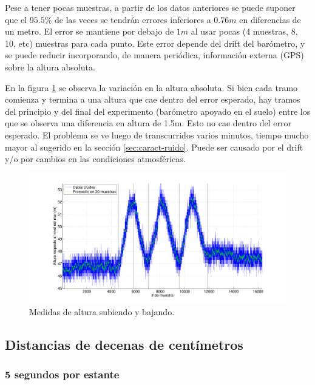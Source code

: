 \documentclass[main]{subfiles}
\begin{document}
Pese a tener pocas muestras, a partir de los datos anteriores se puede suponer que el $95.5 \%$ de las veces se tendrán errores inferiores a $0.76m$ en diferencias de un metro. El error se mantiene por debajo de $1m$ al usar pocas (4 muestras, 8, 10, etc) muestras para cada punto. Este error depende del drift del barómetro, y se puede reducir incorporando, de manera periódica, información externa (GPS) sobre la altura absoluta.

En la figura \ref{fig:variando} se observa la variación en la altura absoluta. Si bien cada tramo comienza y termina a una altura que cae dentro del error esperado, hay tramos del principio y del final del experimento (barómetro apoyado en el suelo) entre los que se observa una diferencia en altura de 1.5m. Esto no cae dentro del error esperado. El problema se ve luego de transcurridos varios minutos, tiempo mucho mayor al sugerido en la sección \ref{sec:caract-ruido}. Puede ser causado por el drift y/o por cambios en las condiciones atmosféricas.

\begin{figure}[H]
\hspace{-50pt}
  \includegraphics[width=1.2\textwidth]{./pics_barom/variando.pdf}
\vspace{-20pt}
  \caption{Medidas de altura subiendo y bajando.}
\vspace{-10pt}
  \label{fig:variando}
\end{figure}

\subsection{Distancias de decenas de centímetros}

\subsubsection{5 segundos por estante}
\end{document}
